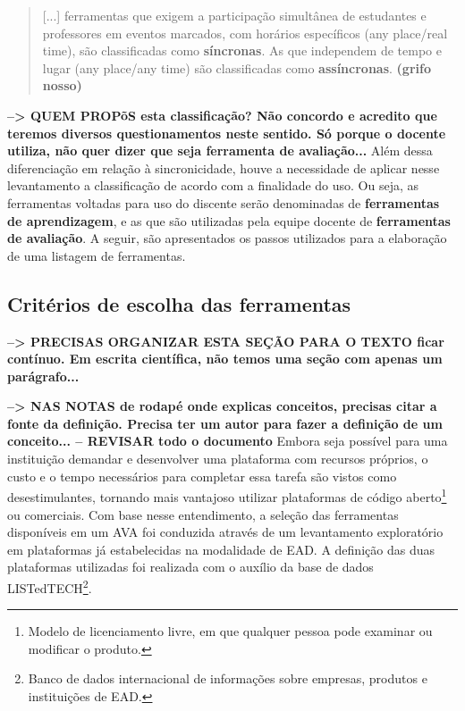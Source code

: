 \begin{quote}
[...] ferramentas que exigem a participação simultânea de estudantes e professores em eventos marcados, com horários específicos (any place/real time), são classificadas como \textbf{síncronas}. As que independem de tempo e lugar (any place/any time) são classificadas como \textbf{assíncronas}. \textbf{(grifo nosso)}
\end{quote}

\textbf{--> QUEM PROPõS esta classificação? Não concordo e acredito que teremos diversos questionamentos neste sentido. Só porque o docente utiliza, não quer dizer que seja ferramenta de avaliação...}
Além dessa diferenciação em relação à sincronicidade, houve a necessidade de aplicar nesse levantamento a classificação de acordo com a finalidade do uso. Ou seja, as ferramentas voltadas para uso do discente serão denominadas de \textbf{ferramentas de aprendizagem}, e as que são utilizadas pela equipe docente de \textbf{ferramentas de avaliação}. A seguir, são apresentados os passos utilizados para a elaboração de uma listagem de ferramentas.


\subsection{Critérios de escolha das ferramentas}%
\textbf{--> PRECISAS ORGANIZAR ESTA SEÇÃO PARA O TEXTO ficar contínuo. Em escrita científica, não temos uma seção com apenas um parágrafo...}

\textbf{--> NAS NOTAS de rodapé onde explicas conceitos, precisas citar a fonte da definição. Precisa ter um autor para fazer a definição de um conceito... -- REVISAR todo o documento}
Embora seja possível para uma instituição demandar e desenvolver uma plataforma com recursos próprios, o custo e o tempo necessários para completar essa tarefa são vistos como desestimulantes, tornando mais vantajoso utilizar plataformas de código aberto\footnote{Modelo de licenciamento livre, em que qualquer pessoa pode examinar ou modificar o produto.} ou comerciais. Com base nesse entendimento, a seleção das ferramentas disponíveis em um AVA foi conduzida através de um levantamento exploratório em plataformas já estabelecidas na modalidade de EAD. A definição das duas plataformas utilizadas foi realizada com o auxílio da base de dados LISTedTECH\footnote{Banco de dados internacional de informações sobre empresas, produtos e instituições de EAD.}. 

